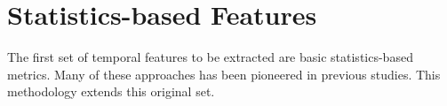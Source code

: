 \section{Statistics-based Features}
\label{sec:statsfeatures}

The first set of temporal features to be extracted are basic statistics-based metrics. Many of these approaches has been pioneered in previous studies. This methodology extends this original set.

